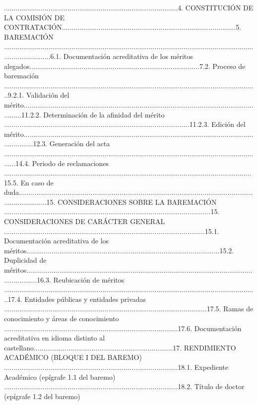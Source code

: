 \documentclass{article}
\begin{document}
\begin{itemize}
..........................................................................................4. CONSTITUCIÓN DE LA COMISIÓN DE CONTRATACIÓN..........................................................................................5. BAREMACIÓN .........................................................................................................................................................6.1. Documentación acreditativa de los méritos alegados........................................................................................7.2. Proceso de baremación ...................................................................................................................................9.2.1. Validación del mérito................................................................................................................................11.2.2. Determinación de la afinidad del mérito ................................................................................................11.2.3. Edición del mérito......................................................................................................................................12.3. Generación del acta .......................................................................................................................................14.4. Periodo de reclamaciones ................................................................................................................................15.5. En caso de duda...............................................................................................................................................15. CONSIDERACIONES SOBRE LA BAREMACIÓN ...........................................................................................................15. CONSIDERACIONES DE CARÁCTER GENERAL ........................................................................................................15.1. Documentación acreditativa de los méritos....................................................................................................15.2. Duplicidad de méritos......................................................................................................................................16.3. Reubicación de méritos ...................................................................................................................................17.4. Entidades públicas y entidades privadas .........................................................................................................17.5. Ramas de conocimiento y áreas de conocimiento ..........................................................................................17.6. Documentación acreditativa en idioma distinto al castellano........................................................................17. RENDIMIENTO ACADÉMICO (BLOQUE I DEL BAREMO) ..........................................................................................18.1. Expediente Académico (epígrafe 1.1 del baremo) ..........................................................................................18.2. Título de doctor (epígrafe 1.2 del baremo) 
\end{itemize}
\end{document}
